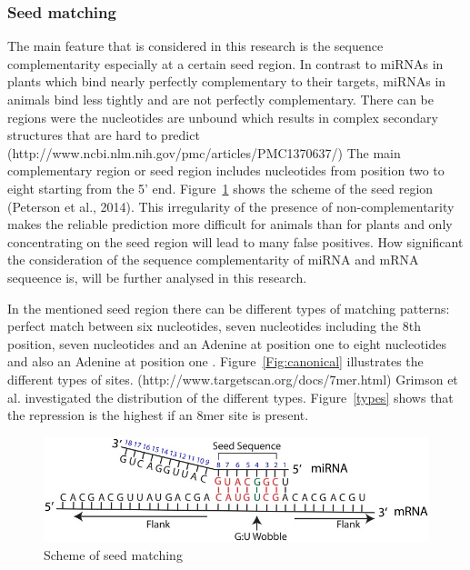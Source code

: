 \documentclass[12pt]{article}
\begin{document}
\subsubsection{Seed matching}
The main feature that is considered in this research is the sequence complementarity especially at a certain seed region. In contrast to miRNAs in plants which bind nearly perfectly complementary to their targets, miRNAs in animals bind less tightly and are not perfectly complementary. There can be regions were the nucleotides are unbound which results in complex secondary structures that are hard to predict \cite{Rehmsmeier} (http://www.ncbi.nlm.nih.gov/pmc/articles/PMC1370637/) The main complementary region or seed region includes nucleotides from position two to eight starting from the 5' end. Figure~\ref{seed} shows the scheme of the seed region (Peterson et al., 2014). This irregularity of the presence of non-complementarity makes the reliable prediction more difficult for animals than for plants and only concentrating on the seed region will lead to many false positives. How significant the consideration of the sequence complementarity of miRNA and mRNA sequeence is, will be further analysed in this research. 

In the mentioned seed region there can be different types of matching patterns: perfect match between six nucleotides, seven nucleotides including the 8th position, seven nucleotides and an Adenine at position one to eight nucleotides and also an Adenine at position one  \cite{Lewis} \cite{Brennecke} \cite{Krek}. Figure~\ref{Fig:canonical} illustrates the different types of sites. (http://www.targetscan.org/docs/7mer.html) Grimson et al. \cite{Grimson} investigated the distribution of the different types. Figure~\ref{types} shows that the repression is the highest if an 8mer site is present. 


\begin{figure}
\centering
\includegraphics[scale=3]{results/seedmatching.png} 
\caption{Scheme of seed matching}
\label{seed}
\end{figure}
\end{document}
